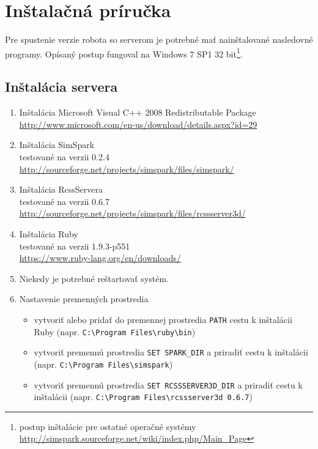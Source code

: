 \section{Inštalačná príručka} \label{appendix_install_guide}

Pre spustenie verzie robota so serverom je potrebné mať nainštalované nasledovné programy. Opísaný postup fungoval na Windows 7 SP1 32 bit\footnote{postup inštalácie pre ostatné operačné systémy \url{http://simspark.sourceforge.net/wiki/index.php/Main_Page}}.

\subsection{Inštalácia servera}
\begin{enumerate}
	\item Inštalácia Microsoft Visual C++ 2008 Redistributable Package 
	\\ \url{http://www.microsoft.com/en-us/download/details.aspx?id=29}
	\item Inštalácia SimSpark
	\\ testované na verzii 0.2.4
	\\ \url{http://sourceforge.net/projects/simspark/files/simspark/}
	\item Inštalácia RcssServera
	\\ testované na verzii 0.6.7 
	\\ \url{http://sourceforge.net/projects/simspark/files/rcssserver3d/}
	\item Inštalácia Ruby
	\\ testované na verzii 1.9.3-p551
	\\ \url{https://www.ruby-lang.org/en/downloads/}
	\item Niekedy je potrebné reštartovať systém.
	\item Nastavenie premenných prostredia
	\begin{itemize}
		\item vytvoriť alebo pridať do premennej prostredia \texttt{PATH} cestu k inštalácii Ruby (napr. \texttt{C:\textbackslash Program Files\textbackslash ruby\textbackslash bin})
		\item vytvoriť premennú prostredia \texttt{SET SPARK\_DIR} a priradiť cestu k inštalácii (napr. \texttt{C:\textbackslash Program Files\textbackslash simspark})
		\item vytvoriť premennú prostredia \texttt{SET RCSSSERVER3D\_DIR} a priradiť cestu k inštalácii (napr. \texttt{C:\textbackslash Program Files\textbackslash rcssserver3d 0.6.7})
	\end{itemize}
\end{enumerate}


